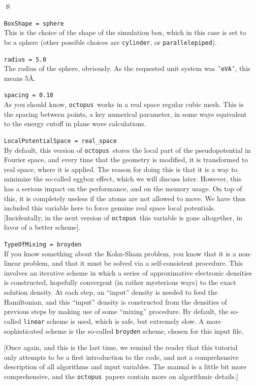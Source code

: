\documentclass[10pt,a4paper,twoside]{article}
\newcommand{\octopus}{{\tt octopus}\ }
\newenvironment{mylist}
{
\begin{list}{$\aleph$}
{
\setlength{\parskip}{0pt}
\setlength{\topsep}{0pt}
\setlength{\partopsep}{0pt}
\setlength{\itemsep}{0pt}
\setlength{\parsep}{0pt}
}
}
{
\end{list}
}
\begin{document}
\begin{mylist}
\item {\tt BoxShape = sphere}\\
This is the choice of the shape of the simulation box, which in this case is set 
to be a sphere (other possible choices are {\tt cylinder}, or {\tt parallelepiped}).

\item {\tt radius = 5.0}\\
The radius of the sphere, obviously. As the requested unit system was {\tt 'eVA'},
this means 5\AA.

\item {\tt spacing = 0.18}\\
As you should know, \octopus works in a real space regular cubic mesh.
This is the spacing between points, a key numerical parameter, in some
ways equivalent to the energy cutoff in plane wave calculations.

\item {\tt LocalPotentialSpace = real\_space}\\
By default, this version of \octopus stores the local part of the pseudopotential in 
Fourier space, and every time that the geometry is modified, it is transformed to 
real space, where it is applied. The reason for doing this is that it is a way to
minimize the so-called eggbox effect, which we will discuss later. However, this has
a serious impact on the performance, and on the memory usage. On top of this, it is completely
useless if the atoms are not allowed to move. We have thus included this
variable here to force genuine real space local potentials.
[Incidentally, in the next version of \octopus this variable is gone altogether,
in favor of a better scheme].

\item {\tt TypeOfMixing = broyden}\\
If you know something about the Kohn-Sham problem, you know that it is a non-linear
problem, and that it must be solved via a self-consistent procedure. This involves
an iterative scheme in which a series of approximative electronic densities
is constructed, hopefully convergent (in rather mysterious ways) to the exact solution
density. At each step, an ``input'' density is needed to feed the Hamiltonian,
and this ``input'' density is constructed from the densities of previous steps
by making use of some ``mixing'' procedure. By default, the so-called {\tt linear}
scheme is used, which is safe, but extremely slow. A more sophisticated scheme
is the so-called {\tt broyden} scheme, chosen for this input file.

[Once again, and this is the last time, we remind the reader that this tutorial
only attempts to be a first introduction to the code, and not a comprehensive
description of all algorithms and input variables. The manual is a little bit
more comprehensive, and the \octopus papers contain more on algorithmic details.]

\end{mylist}
\end{document}
